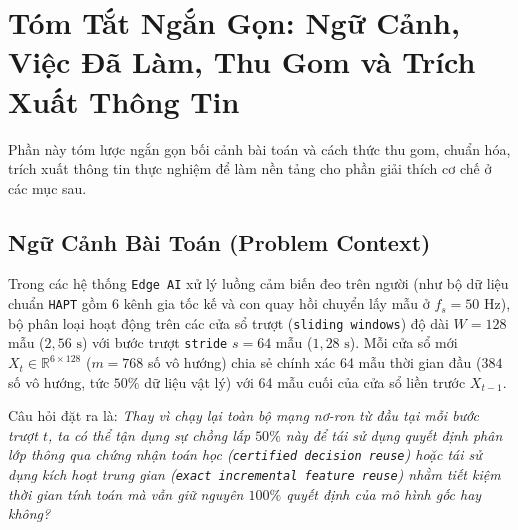 \documentclass[11pt,a4paper]{article}
\newcommand{\R}{\mathbb{R}}
\newcommand{\code}[1]{{\small\ttfamily\nolinkurl{#1}}}
\begin{document}
\section{Tóm Tắt Ngắn Gọn: Ngữ Cảnh, Việc Đã Làm, Thu Gom và Trích Xuất Thông Tin}

Phần này tóm lược ngắn gọn bối cảnh bài toán và cách thức thu gom, chuẩn hóa, trích xuất thông tin thực nghiệm để làm nền tảng cho phần giải thích cơ chế ở các mục sau.

\subsection{Ngữ Cảnh Bài Toán (Problem Context)}
Trong các hệ thống \code{Edge AI} xử lý luồng cảm biến đeo trên người (như bộ dữ liệu chuẩn \code{HAPT} gồm 6 kênh gia tốc kế và con quay hồi chuyển lấy mẫu ở $f_s = 50\text{ Hz}$), bộ phân loại hoạt động trên các cửa sổ trượt (\code{sliding windows}) độ dài $W = 128$ mẫu ($2,56\text{ s}$) với bước trượt \code{stride} $s = 64$ mẫu ($1,28\text{ s}$). Mỗi cửa sổ mới $X_t \in \R^{6 \times 128}$ ($m = 768$ số vô hướng) chia sẻ chính xác 64 mẫu thời gian đầu ($384$ số vô hướng, tức $50\%$ dữ liệu vật lý) với 64 mẫu cuối của cửa sổ liền trước $X_{t-1}$.

Câu hỏi đặt ra là: \textit{Thay vì chạy lại toàn bộ mạng nơ-ron từ đầu tại mỗi bước trượt $t$, ta có thể tận dụng sự chồng lấp $50\%$ này để tái sử dụng quyết định phân lớp thông qua chứng nhận toán học (\code{certified decision reuse}) hoặc tái sử dụng kích hoạt trung gian (\code{exact incremental feature reuse}) nhằm tiết kiệm thời gian tính toán mà vẫn giữ nguyên $100\%$ quyết định của mô hình gốc hay không?}
\end{document}
